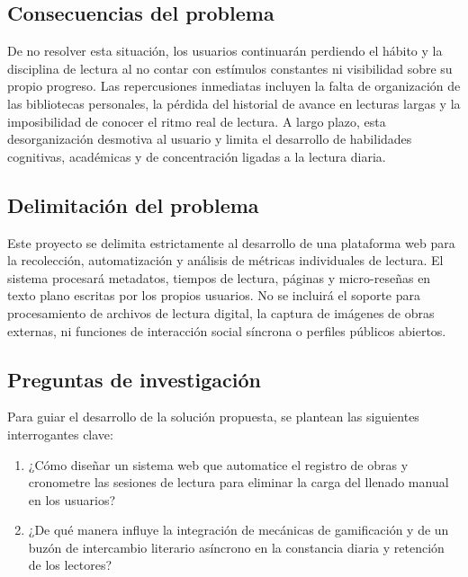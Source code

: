 \documentclass[12pt, atypical, journal]{article}
\begin{document}
\subsection{Consecuencias del problema}
De no resolver esta situación, los usuarios continuarán perdiendo el hábito y la disciplina de lectura al no contar con estímulos constantes ni visibilidad sobre su propio progreso. Las repercusiones inmediatas incluyen la falta de organización de las bibliotecas personales, la pérdida del historial de avance en lecturas largas y la imposibilidad de conocer el ritmo real de lectura. A largo plazo, esta desorganización desmotiva al usuario y limita el desarrollo de habilidades cognitivas, académicas y de concentración ligadas a la lectura diaria.

\subsection{Delimitación del problema}
Este proyecto se delimita estrictamente al desarrollo de una plataforma web para la recolección, automatización y análisis de métricas individuales de lectura. El sistema procesará metadatos, tiempos de lectura, páginas y micro-reseñas en texto plano escritas por los propios usuarios. No se incluirá el soporte para procesamiento de archivos de lectura digital, la captura de imágenes de obras externas, ni funciones de interacción social síncrona o perfiles públicos abiertos.

\subsection{Preguntas de investigación}
Para guiar el desarrollo de la solución propuesta, se plantean las siguientes interrogantes clave:
\begin{enumerate}
    \item ¿Cómo diseñar un sistema web que automatice el registro de obras y cronometre las sesiones de lectura para eliminar la carga del llenado manual en los usuarios?
    \item ¿De qué manera influye la integración de mecánicas de gamificación y de un buzón de intercambio literario asíncrono en la constancia diaria y retención de los lectores?
\end{enumerate}
\end{document}
